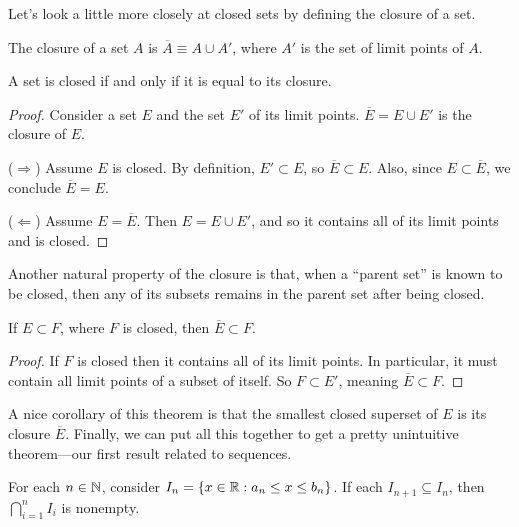 \documentclass[../m131main.tex]{subfiles}
\begin{document}
Let's look a little more closely at closed sets by defining the closure of a set.

\begin{definition}[Closure]
    The closure of a set $A$ is $\overline{A} \equiv A \cup A'$, where $A'$ is the set of limit points of $A$.
\end{definition}

\begin{theorem}[]
    A set is closed if and only if it is equal to its closure.
\end{theorem}

\begin{proof}
    Consider a set $E$ and the set $E'$ of its limit points.
    $\overline{E} = E \cup E'$ is the closure of $E$.

    ($\Rightarrow$)
    Assume $E$ is closed.
    By definition, $E' \subset E$, so $\overline{E} \subset E$.
    Also, since $E \subset \overline{E}$, we conclude $\overline{E} = E$.
    \smallskip

    ($\Leftarrow$)
    Assume $E = \overline{E}$.
    Then $E = E \cup E'$, and so it contains all of its limit points and is closed.
\end{proof}

Another natural property of the closure is that, when a ``parent set'' is known to be closed, then any of its subsets remains in the parent set after being closed.

\begin{theorem}[]
    If $E \subset F$, where $F$ is closed, then $\overline{E} \subset F$.
\end{theorem}

\begin{proof}
    If $F$ is closed then it contains all of its limit points.
    In particular, it must contain all limit points of a subset of itself.
    So $F \subset E'$, meaning $\overline{E} \subset F$.
\end{proof}

A nice corollary of this theorem is that the smallest closed superset of $E$ is its closure $\overline{E}$.
Finally, we can put all this together to get a pretty unintuitive theorem---our first result related to sequences.

\begin{theorem}
    For each $n \in \mathbb{N}$, consider $I_n = \left\{ x \in \mathbb{R} : a_n \leq x \leq b_n \right\}$.
    If each $I_{n+1} \subseteq I_n$, then $\bigcap_{i=1}^n I_i$ is nonempty.
\end{theorem}
\end{document}
